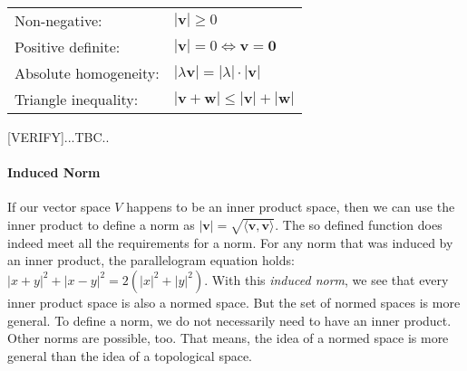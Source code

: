 \medskip
\begin{tabular}{l l}
Non-negative:         & $|\mathbf{v}| \geq 0$  \\
Positive definite:    & $|\mathbf{v}| = 0 \Leftrightarrow \mathbf{v} = \mathbf{0}$  \\
Absolute homogeneity: & $|\lambda \mathbf{v}| = |\lambda| \cdot |\mathbf{v}|$  \\
Triangle inequality:  & $|\mathbf{v} + \mathbf{w}| \leq |\mathbf{v}| + |\mathbf{w}|$
\end{tabular}
\medskip

[VERIFY]...TBC..


\paragraph{Induced Norm}
If our vector space $V$ happens to be an inner product space, then we can use the inner product to define a norm as $|\mathbf{v}| = \sqrt{\langle \mathbf{v,v}  \rangle}$. The so defined function does indeed meet all the requirements for a norm. For any norm that was induced by an inner product, the parallelogram equation holds: $|x+y|^2 + |x-y|^2 = 2(|x|^2 + |y|^2)$. With this \emph{induced norm}, we see that every inner product space is also a normed space. But the set of normed spaces is more general. To define a norm, we do not necessarily need to have an inner product. Other norms are possible, too. That means, the idea of a normed space is more general than the idea of a topological space.






